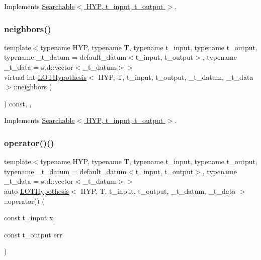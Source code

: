 Implements \hyperlink{class_searchable_a64bda92cc9314dae7aff31f4444a93e6}{Searchable$<$ H\+Y\+P, t\+\_\+input, t\+\_\+output $>$}.

\mbox{\label{class_l_o_t_hypothesis_ac74e874f6b677dc1c013602907627be7}} 
\subsubsection{\texorpdfstring{neighbors()}{neighbors()}}
{\footnotesize\ttfamily template$<$typename H\+YP, typename T, typename t\+\_\+input, typename t\+\_\+output, typename \+\_\+t\+\_\+datum = default\+\_\+datum$<$t\+\_\+input, t\+\_\+output$>$, typename \+\_\+t\+\_\+data = std\+::vector$<$\+\_\+t\+\_\+datum$>$$>$ \\
virtual int \hyperlink{class_l_o_t_hypothesis}{L\+O\+T\+Hypothesis}$<$ H\+YP, T, t\+\_\+input, t\+\_\+output, \+\_\+t\+\_\+datum, \+\_\+t\+\_\+data $>$\+::neighbors (\begin{DoxyParamCaption}{ }\end{DoxyParamCaption}) const\hspace{0.3cm}{\ttfamily [inline]}, {\ttfamily [override]}, {\ttfamily [virtual]}}



Implements \hyperlink{class_searchable_a0450c35a21c5940a63560aa24b4ff0cc}{Searchable$<$ H\+Y\+P, t\+\_\+input, t\+\_\+output $>$}.

\mbox{\label{class_l_o_t_hypothesis_ae64a27eeb271316fd76cf26a86fff7e6}} 
\subsubsection{\texorpdfstring{operator()()}{operator()()}}
{\footnotesize\ttfamily template$<$typename H\+YP, typename T, typename t\+\_\+input, typename t\+\_\+output, typename \+\_\+t\+\_\+datum = default\+\_\+datum$<$t\+\_\+input, t\+\_\+output$>$, typename \+\_\+t\+\_\+data = std\+::vector$<$\+\_\+t\+\_\+datum$>$$>$ \\
auto \hyperlink{class_l_o_t_hypothesis}{L\+O\+T\+Hypothesis}$<$ H\+YP, T, t\+\_\+input, t\+\_\+output, \+\_\+t\+\_\+datum, \+\_\+t\+\_\+data $>$\+::operator() (\begin{DoxyParamCaption}\item[{const t\+\_\+input}]{x,  }\item[{const t\+\_\+output}]{err }\end{DoxyParamCaption})\hspace{0.3cm}{\ttfamily [inline]}}

